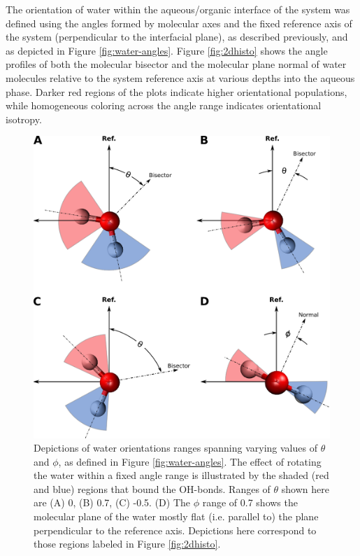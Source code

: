 The orientation of water within the aqueous/organic interface of the system was defined using the angles formed by molecular axes and the fixed reference axis of the system (perpendicular to the interfacial plane), as described previously, and as depicted in Figure \ref{fig:water-angles}. Figure \ref{fig:2dhisto} shows the angle profiles of both the molecular bisector and the molecular plane normal of water molecules relative to the system reference axis at various depths into the aqueous phase. Darker red regions of the plots indicate higher orientational populations, while homogeneous coloring across the angle range indicates orientational isotropy.

\newcommand{\degree}{\ensuremath{^\circ}}

\begin{figure}[h!]
\begin{center}
	\includegraphics[scale=1.0]{images/h2o-angle-ranges.png}
	\caption{Depictions of water orientations ranges spanning varying values of $\theta$ and $\phi$, as defined in Figure \ref{fig:water-angles}. The effect of rotating the water within a fixed angle range is illustrated by the shaded (red and blue) regions that bound the OH-bonds. Ranges of $\theta$ shown here are (A) 0, (B) 0.7, (C) -0.5. (D) The $\phi$ range of 0.7 shows the molecular plane of the water mostly flat (i.e. parallel to) the plane perpendicular to the reference axis. Depictions here correspond to those regions labeled in Figure \ref{fig:2dhisto}.}
	\label{fig:angle-ranges}
\end{center}
\end{figure}


